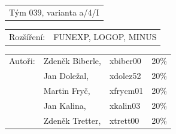 \begin{titlepage}
\begin{flushleft}
\begin{large}
\begin{tabular}{l}
Tým 039, varianta a/4/I
\end{tabular}
\newline
\begin{tabular}{ll}
Rozšíření: & FUNEXP, LOGOP, MINUS
\end{tabular}
\newline
\newline
\begin{tabular}{llll}
Autoři: & Zdeněk Biberle, & xbiber00 & 20\% \\
        & Jan Doležal,    & xdolez52 & 20\% \\
        & Martin Fryč,    & xfrycm01 & 20\% \\
        & Jan Kalina,     & xkalin03 & 20\% \\
        & Zdeněk Tretter, & xtrett00 & 20\% \\
\end{tabular}
\end{large}
\end{flushleft}
\end{titlepage}
